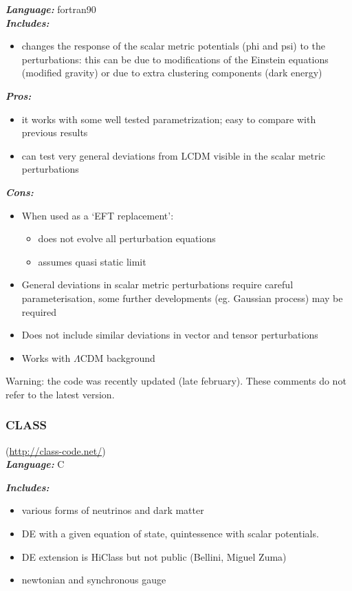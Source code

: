 {\it \bf Language:} fortran90\\

{\it \bf Includes: }
\begin{itemize}
 \item changes the response of the scalar metric potentials (phi and psi) to the perturbations: this can be due to modifications of the Einstein equations 
 (modified gravity) or due to extra clustering components (dark energy)
\end{itemize}

{\it \bf Pros: }
\begin{itemize}
 \item it works with some well tested parametrization; easy to compare with previous results 
 \item can test  very general deviations from LCDM visible in the scalar metric perturbations
\end{itemize}

{\it \bf Cons: }
\begin{itemize}
 \item When used as a ‘EFT replacement’:
 \begin{itemize}
  \item does not evolve all perturbation equations 
  \item assumes quasi static limit
 \end{itemize}
 \item General deviations in scalar metric perturbations require careful parameterisation, some further developments (eg. Gaussian process) may be required
 \item Does not include similar deviations in vector and tensor perturbations
 \item Works with $\Lambda$CDM background
\end{itemize}
Warning: the code was recently updated (late february). These comments do not refer to the latest version.\\

\newpage
\subsubsection{CLASS}(\url{http://class-code.net/})\\

{\it \bf  Language:} C

{\it \bf Includes:}
\begin{itemize}
 \item various forms of neutrinos and dark matter
 \item DE with a given equation of state, quintessence with scalar potentials.
 \item DE extension is HiClass but not public (Bellini, Miguel Zuma)
 \item newtonian and synchronous gauge
\end{itemize}

